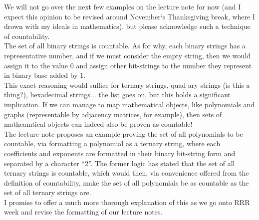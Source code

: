 We will not go over the next few examples on the lecture note for now (and I expect this opinion to be revised around November`s Thanksgiving break, where I drown with my ideals in mathematics), but please acknowledge such a technique of countability. \\
The set of all binary strings is countable. As for why, each binary strings has a representative number, and if we must consider the empty string, then we would assign it to the value $0$ and assign other bit-strings to the number they represent in binary base added by $1$. \\
This exact reasoning would suffice for ternary strings, quad-ary strings (is this a thing?), hexadecimal strings... the list goes on, but this holds a significant implication. If we can manage to map mathematical objects, like polynomials and graphs (representable by adjacency matrices, for example), then sets of matheamtical objects can indeed also be proven as countable! \\
The lecture note proposes an example proving the set of all polynomials to be countable, via formatting a polynomial as a ternary string, where each coefficients and exponents are formatted in their binary bit-string form and separated by a character ``2''. The former logic has stated that the set of all ternary strings is countable, which would then, via convenience offered from the definition of countability, make the set of all polynomials be as countable as the set of all ternary strings are. \\
I promise to offer a much more thorough explanation of this as we go onto RRR week and revise the formatting of our lecture notes.

